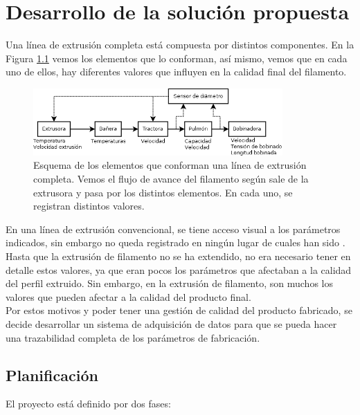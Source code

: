 \chapter{Desarrollo de la solución propuesta}
\label{cap:descrip}

Una línea de extrusión completa está compuesta por distintos componentes. En la Figura \ref{fig:esquema_extrusora} vemos los elementos que lo conforman, así mismo, vemos que en cada uno de ellos, hay diferentes valores que influyen en la calidad final del filamento.

\begin{figure}[H]
    \centering
    \includegraphics[width=0.85\textwidth]{images/esquema_extrusion.png}
    \caption[Esquema de los elementos que conforman una extrusora.]{Esquema de los elementos que conforman una línea de extrusión completa. Vemos el flujo de avance del filamento según sale de la extrusora y pasa por los distintos elementos. En cada uno, se registran distintos valores.}
    \label{fig:esquema_extrusora}
\end{figure}

En una línea de extrusión convencional, se tiene acceso visual a los parámetros indicados, sin embargo no queda registrado en ningún lugar de cuales han sido . Hasta que la extrusión de filamento no se ha extendido, no era necesario tener en detalle estos valores, ya que eran pocos los parámetros que afectaban a la calidad del perfil extruido. Sin embargo, en la extrusión de filamento, son muchos los valores que pueden afectar a la calidad del producto final.\\

Por estos motivos y poder tener una gestión de calidad del producto fabricado, se decide desarrollar un sistema de adquisición de datos para que se pueda hacer una trazabilidad completa de los parámetros de fabricación.\\

\section{Planificación}
\label{sec:planificacion}

El proyecto está definido por dos fases:\\

